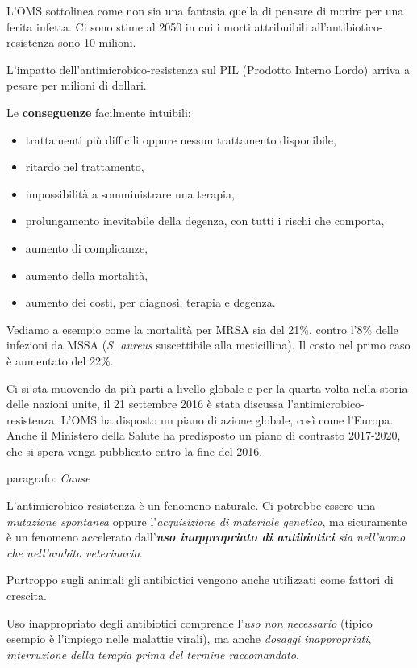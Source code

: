 \documentclass[]{article}
\begin{document}
L'OMS sottolinea come non sia una fantasia quella di pensare di morire
per una ferita infetta. Ci sono stime al 2050 in cui i morti
attribuibili all'antibiotico-resistenza sono 10 milioni.

L'impatto dell'antimicrobico-resistenza sul PIL (Prodotto Interno Lordo)
arriva a pesare per milioni di dollari.

Le \textbf{conseguenze} facilmente intuibili:

\begin{itemize}
\item
  trattamenti più difficili oppure nessun trattamento disponibile,
\item
  ritardo nel trattamento,
\item
  impossibilità a somministrare una terapia,
\item
  prolungamento inevitabile della degenza, con tutti i rischi che
  comporta,
\item
  aumento di complicanze,
\item
  aumento della mortalità,
\item
  aumento dei costi, per diagnosi, terapia e degenza.
\end{itemize}

Vediamo a esempio come la mortalità per MRSA sia del 21\%, contro l'8\%
delle infezioni da MSSA (\emph{S. aureus} suscettibile alla
meticillina). Il costo nel primo caso è aumentato del 22\%.

Ci si sta muovendo da più parti a livello globale e per la quarta volta
nella storia delle nazioni unite, il 21 settembre 2016 è stata discussa
l'antimicrobico-resistenza. L'OMS ha disposto un piano di azione
globale, così come l'Europa. Anche il Ministero della Salute ha
predisposto un piano di contrasto 2017-2020, che si spera venga
pubblicato entro la fine del 2016.

paragrafo: \emph{Cause}

L'antimicrobico-resistenza è un fenomeno naturale. Ci potrebbe essere
una \emph{mutazione spontanea} oppure l'\emph{acquisizione di materiale
genetico}, ma sicuramente è un fenomeno accelerato
dall'\emph{\textbf{uso inappropriato di antibiotici} sia nell'uomo che
nell'ambito veterinario}.

Purtroppo sugli animali gli antibiotici vengono anche utilizzati come
fattori di crescita.

Uso inappropriato degli antibiotici comprende l'\emph{uso non
necessario} (tipico esempio è l'impiego nelle malattie virali), ma anche
\emph{dosaggi inappropriati}, \emph{interruzione della terapia prima del
termine raccomandato}.
\end{document}
